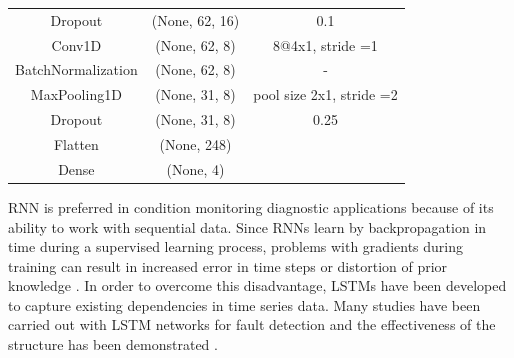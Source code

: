 \begin{table}[h]
{\begin{center}
\begin{tabular}{ccc}
			Dropout            & (None, 62, 16)    & 0.1                      \\
			Conv1D             & (None, 62, 8)     & 8@4x1, stride =1         \\
			BatchNormalization & (None, 62, 8)     & -                        \\
			MaxPooling1D       & (None, 31, 8)     & pool size 2x1, stride =2 \\
			Dropout            & (None, 31, 8)     & 0.25                     \\
			Flatten            & (None, 248)       &                          \\
			Dense              & (None, 4)         &                         \\				
				\hline
			\end{tabular}
			\vspace{-6mm}
		\end{center}}
		\label{cnn}
\end{table}

RNN is preferred in condition monitoring diagnostic applications because of its ability to work with sequential data. Since RNNs learn by backpropagation in time during a supervised learning process, problems with gradients during training can result in increased error in time steps or distortion of prior knowledge \cite{enshaei2019application}. In order to overcome this disadvantage, LSTMs have been developed to capture existing dependencies in time series data. Many studies have been carried out with LSTM networks for fault detection and the effectiveness of the structure has been demonstrated \cite{bai2021long,he2021fpga,khan2018review,sabir2019lstm}.

